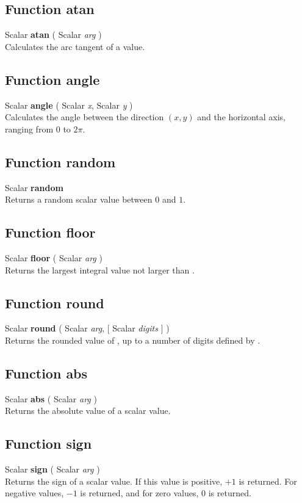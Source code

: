 \subsection{Function atan \label{F:atan}}
Scalar \textbf{atan} ( Scalar \textit{arg} ) \\
Calculates the arc tangent of a value.

\subsection{Function angle \label{F:angle}}
Scalar \textbf{angle} ( Scalar \textit{x}, Scalar \textit{y} ) \\
Calculates the angle between the direction $(x,y)$ and the horizontal axis, ranging from $0$ to $2 \pi$.

\subsection{Function random \label{F:random}}
Scalar \textbf{random} \\
Returns a random scalar value between $0$ and $1$.

\subsection{Function floor \label{F:floor}}
Scalar \textbf{floor} ( Scalar \textit{arg} ) \\
Returns the largest integral value not larger than .

\subsection{Function round \label{F:round}}
Scalar \textbf{round} ( Scalar \textit{arg},  [ Scalar \textit{digits} ] ) \\
Returns the rounded value of , up to a number of digits defined by .

\subsection{Function abs \label{F:abs}}
Scalar \textbf{abs} ( Scalar \textit{arg} ) \\
Returns the absolute value of a scalar value.

\subsection{Function sign \label{F:sign}}
Scalar \textbf{sign} ( Scalar \textit{arg} ) \\
Returns the sign of a scalar value. If this value is positive, $+1$ is returned. For negative values, $-1$ is returned, and  for zero values, $0$ is returned.

